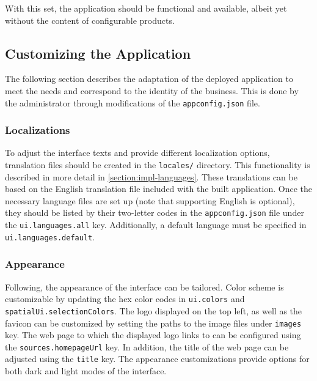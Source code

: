 With this set, the application should be functional and available, albeit yet without the content of configurable products.


\subsection{Customizing the Application}

The following section describes the adaptation of the deployed application to meet the needs and correspond to the identity of the business. This is done by the administrator through modifications of the \texttt{appconfig.json} file.


\subsubsection{Localizations}

To adjust the interface texts and provide different localization options, translation files should be created in the \texttt{locales/} directory. This functionality is described in more detail in \autoref{section:impl-languages}. These translations can be based on the English translation file included with the built application. Once the necessary language files are set up (note that supporting English is optional), they should be listed by their two-letter codes in the \texttt{appconfig.json} file under the \texttt{ui.languages.all} key. Additionally, a default language must be specified in \texttt{ui.languages.default}.


\subsubsection{Appearance}

Following, the appearance of the interface can be tailored. Color scheme is customizable by updating the hex color codes in \texttt{ui.colors} and \texttt{spatialUi.selectionColors}. The logo displayed on the top left, as well as the favicon can be customized by setting the paths to the image files under \texttt{images} key. The web page to which the displayed logo links to can be configured using the \texttt{sources.homepageUrl} key. In addition, the title of the web page can be adjusted using the \texttt{title} key. The appearance customizations provide options for both dark and light modes of the interface.

